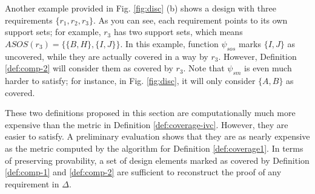 Another example provided in Fig. \ref{fig:disc} (b) shows a design with
three requirements $\{ r_1, r_2, r_3\}$. As you can see, each requirement points to its
own support sets; for example, $r_3$ has two support sets,
which means $ASOS(r_3) = \{ \{B, H\}, \{I, J\}\}$. In this example,
function $\psi_{sos}$ marks $\{I, J\}$ as uncovered, while they are actually covered in a way by $r_3$.
However, Definition \ref{def:comp-2} will consider them as covered by $r_3$.
Note that $\psi_{sm}$ is even much harder to satisfy; for instance, in Fig. \ref{fig:disc},
it will only consider $\{ A, B\}$ as covered.

These two definitions proposed in this section are computationally much more expensive than the metric in Definition \ref{def:coverage-ivc}. However, they are easier to satisfy. A preliminary evaluation shows that they are as nearly expensive as the metric computed by the \mustalg algorithm for Definition \ref{def:coverage1}.
In terms of preserving provability, a set of design elements marked as covered by Definition \ref{def:comp-1} and \ref{def:comp-2} are
sufficient to reconstruct the proof of any requirement in $\Delta$.

